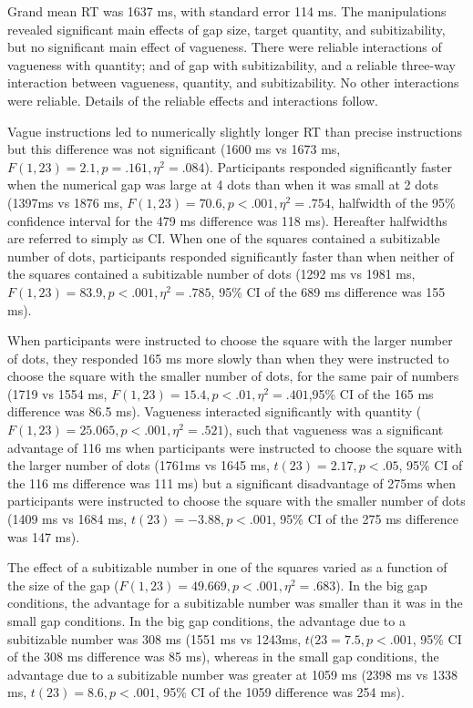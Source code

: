 \documentclass[man,floatmark]{apa}
\begin{document}
Grand mean RT was 1637 ms, with standard error 114 ms. The manipulations revealed significant main effects of gap size, target quantity, and subitizability, but no significant main effect of vagueness. There were reliable interactions of vagueness with quantity; and of gap with subitizability, and a reliable three-way interaction between vagueness, quantity, and subitizability. No other interactions were reliable. Details of the reliable effects and interactions follow. 

Vague instructions led to numerically slightly longer RT than precise instructions but this difference was not significant (1600 ms vs 1673 ms, $F(1,23)=2.1, p = .161,  \eta^2 =.084$). Participants responded significantly faster when the numerical gap was large at 4 dots than when it was small at 2 dots (1397ms vs 1876 ms, $F(1,23)=70.6, p<.001, \eta^2 = .754$, halfwidth of the 95\% confidence interval for the 479 ms difference was 118 ms). Hereafter halfwidths are referred to simply as CI. When one of the squares contained a subitizable number of dots, participants responded significantly  faster than when neither of the squares contained a subitizable number of dots (1292 ms vs 1981 ms, $F(1,23)=83.9, p<.001, \eta^2 =.785$, 95\% CI of the 689 ms difference was 155 ms).

When participants were instructed to choose the square with the larger number of dots, they responded 165 ms more slowly than when they were instructed to choose the square with the smaller number of dots, for the same pair of numbers (1719 vs 1554 ms, $F(1,23)=15.4, p<.01,  \eta^2 =.401$,95\% CI of the 165 ms difference was 86.5 ms). Vagueness interacted significantly with quantity ($F(1,23)=25.065,p<.001,\eta^2=.521$), such that vagueness was a significant advantage of 116 ms when participants were instructed to choose the square with the larger number of dots (1761ms vs 1645 ms, $t(23)=2.17,p<.05$, 95\% CI of the 116 ms difference was 111 ms) but a significant disadvantage of 275ms when participants were instructed to choose the square with the smaller number of dots (1409 ms vs 1684 ms, $t(23)=-3.88, p < .001$, 95\% CI of the 275 ms difference was 147 ms).

The effect of a subitizable number in one of the squares varied as a function of the size of the gap ($F(1,23)=49.669,p<.001,\eta^2=.683$). In the big gap conditions, the advantage for a subitizable number was smaller than it was in the small gap conditions. In the big gap conditions, the advantage due to a subitizable number was 308 ms (1551 ms vs 1243ms, $t(23=7.5, p<.001$, 95\% CI of the 308 ms difference was 85 ms), whereas in the small gap conditions, the advantage due to a subitizable number was greater at 1059 ms (2398 ms vs 1338 ms, $t(23) = 8.6, p<.001$, 95\% CI of the 1059 difference was 254 ms).
\end{document}
